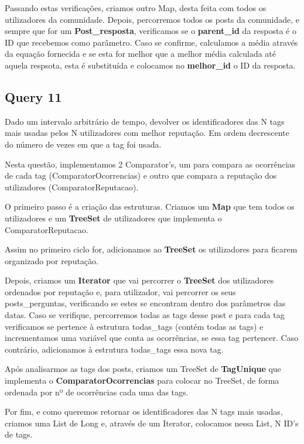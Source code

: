 \documentclass[a4paper]{article}
\begin{document}
Passando estas verificações, criamos outro Map, desta feita com todos os utilizadores da comunidade. Depois, percorremos todos os posts da comunidade, e sempre que for um \textbf{Post_resposta}, verificamos se o \textbf{parent_id} da resposta é o ID que recebemos como parâmetro. Caso se confirme, calculamos a média através da equação fornecida e se esta for melhor que a melhor média calculada até aquela respsota, esta é substituída e colocamos no \textbf{melhor_id} o ID da resposta.



\subsection{Query 11}


Dado um intervalo arbitrário de tempo, devolver os identificadores das N tags
mais usadas pelos N utilizadores com melhor reputação. Em ordem decrescente 
do número de vezes em que a tag foi usada.

Nesta questão, implementamos 2 Comparator's, um para compara as ocorrências de cada tag (ComparatorOcorrencias) e outro que compara a reputação dos utilizadores (ComparatorReputacao).

O primeiro passo é a criação das estruturas. Criamos um \textbf{Map} que tem todos os utilizadores e um \textbf{TreeSet} de utilizadores que implementa o ComparatorReputacao.

Assim no primeiro ciclo for, adicionamos ao \textbf{TreeSet} os utilizadores para ficarem organizado por reputação.

Depois, criamos um \textbf{Iterator} que vai percorrer o \textbf{TreeSet} dos utilizadores ordenados por reputação e, para utilizador, vai percorrer os seus posts_perguntas, verificando se estes se encontram dentro dos parâmetros das datas. Caso se verifique, percorremos todas as tags desse post e para cada tag verificamos se pertence à estrutura todas_tags (contém todas as tags) e incrementamos uma variável que conta as ocorrências, se essa tag pertencer. Caso contrário, adicionamos à estrutura todas_tags essa nova tag.

Após analisarmos as tags dos posts, criamos um TreeSet de \textbf{TagUnique} que implementa o \textbf{ComparatorOcorrencias} para colocar no TreeSet, de forma ordenada por nº de ocorrências cada uma das tags.

Por fim, e como queremos retornar os identificadores das N tags mais usadas, criamos uma List de Long  e, através de um Iterator, colocamos nessa List, N ID's de tags.
\end{document}
